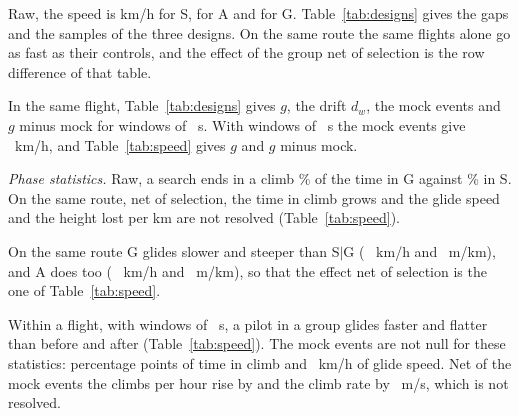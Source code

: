 \documentclass[aps,prl,twocolumn,superscriptaddress,nofootinbib]{revtex4-2}
\begin{document}
Raw, the speed is \LtRawXcS{} \LtRawXcSBand{} km/h for S, \LtRawXcA{} \LtRawXcABand{} for A and
\LtRawXcG{} \LtRawXcGBand{} for G. Table~\ref{tab:designs} gives the gaps and the samples of the three
designs. On the same route the same flights alone go as fast as their controls, and the effect of the
group net of selection is the row difference of that table.

In the same flight, Table~\ref{tab:designs} gives $g$, the drift $d_w$, the mock events and $g$ minus
mock for windows of \LtWinMax~s. With windows of \LtWinMid~s the mock events give \PreMockGXc{}
\PreMockGXcBand~km/h, and Table~\ref{tab:speed} gives $g$ and $g$ minus mock.

\emph{Phase statistics.} Raw, a search ends in a climb \RawStatFoundG\% of the time in G against
\RawStatFoundS\% in S. On the same route, net of selection, the time in climb grows and the glide
speed and the height lost per km are not resolved (Table~\ref{tab:speed}).

On the same route G glides slower and steeper than S$|$G (\MatDeltaGlideG{} \MatDeltaGlideGBand~km/h and
\MatDeltaSinkG{} \MatDeltaSinkGBand~m/km), and A does too (\MatDeltaGlideA{} \MatDeltaGlideABand~km/h
and \MatDeltaSinkA{} \MatDeltaSinkABand~m/km), so that the effect net of selection is the one of
Table~\ref{tab:speed}.

Within a flight, with windows of \LtWinMid~s, a pilot in a group glides faster and flatter than before
and after (Table~\ref{tab:speed}). The mock events are not null for these statistics:
\PreMockGClimb{} \PreMockGClimbBand{} percentage points of time in climb and \PreMockGGlide{}
\PreMockGGlideBand~km/h of glide speed. Net of the mock events the climbs per hour rise by
\PreNetGCph{} \PreNetGCphBand{} and the climb rate by \PreNetGRate{} \PreNetGRateBand~m/s, which is not
resolved.
\end{document}
